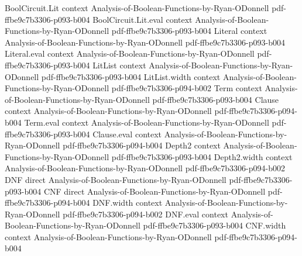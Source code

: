 \begin{lemma}
\leanok
{}
\proofstep
  {BoolCircuit.Lit}
  {context}
  {Analysis-of-Boolean-Functions-by-Ryan-ODonnell}
  {pdf-ffbe9c7b3306-p093-b004}
\proofstep
  {BoolCircuit.Lit.eval}
  {context}
  {Analysis-of-Boolean-Functions-by-Ryan-ODonnell}
  {pdf-ffbe9c7b3306-p093-b004}
\proofstep
  {Literal}
  {context}
  {Analysis-of-Boolean-Functions-by-Ryan-ODonnell}
  {pdf-ffbe9c7b3306-p093-b004}
\proofstep
  {Literal.eval}
  {context}
  {Analysis-of-Boolean-Functions-by-Ryan-ODonnell}
  {pdf-ffbe9c7b3306-p093-b004}
\proofstep
  {LitList}
  {context}
  {Analysis-of-Boolean-Functions-by-Ryan-ODonnell}
  {pdf-ffbe9c7b3306-p093-b004}
\proofstep
  {LitList.width}
  {context}
  {Analysis-of-Boolean-Functions-by-Ryan-ODonnell}
  {pdf-ffbe9c7b3306-p094-b002}
\proofstep
  {Term}
  {context}
  {Analysis-of-Boolean-Functions-by-Ryan-ODonnell}
  {pdf-ffbe9c7b3306-p093-b004}
\proofstep
  {Clause}
  {context}
  {Analysis-of-Boolean-Functions-by-Ryan-ODonnell}
  {pdf-ffbe9c7b3306-p094-b004}
\proofstep
  {Term.eval}
  {context}
  {Analysis-of-Boolean-Functions-by-Ryan-ODonnell}
  {pdf-ffbe9c7b3306-p093-b004}
\proofstep
  {Clause.eval}
  {context}
  {Analysis-of-Boolean-Functions-by-Ryan-ODonnell}
  {pdf-ffbe9c7b3306-p094-b004}
\proofstep
  {Depth2}
  {context}
  {Analysis-of-Boolean-Functions-by-Ryan-ODonnell}
  {pdf-ffbe9c7b3306-p093-b004}
\proofstep
  {Depth2.width}
  {context}
  {Analysis-of-Boolean-Functions-by-Ryan-ODonnell}
  {pdf-ffbe9c7b3306-p094-b002}
\proofstep
  {DNF}
  {direct}
  {Analysis-of-Boolean-Functions-by-Ryan-ODonnell}
  {pdf-ffbe9c7b3306-p093-b004}
\proofstep
  {CNF}
  {direct}
  {Analysis-of-Boolean-Functions-by-Ryan-ODonnell}
  {pdf-ffbe9c7b3306-p094-b004}
\proofstep
  {DNF.width}
  {context}
  {Analysis-of-Boolean-Functions-by-Ryan-ODonnell}
  {pdf-ffbe9c7b3306-p094-b002}
\proofstep
  {DNF.eval}
  {context}
  {Analysis-of-Boolean-Functions-by-Ryan-ODonnell}
  {pdf-ffbe9c7b3306-p093-b004}
\proofstep
  {CNF.width}
  {context}
  {Analysis-of-Boolean-Functions-by-Ryan-ODonnell}
  {pdf-ffbe9c7b3306-p094-b004}
\proofstep

\end{lemma}
